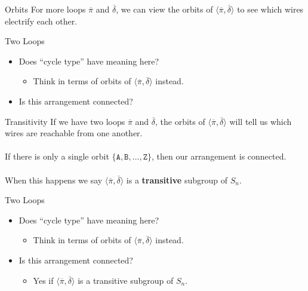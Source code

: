\documentclass[hyphens,aspectratio=169]{beamer}
\begin{document}
\begin{frame}{Orbits}
    For more loops $\overline\pi$ and $\overline\delta$, we can view the orbits of $\langle\overline\pi, \overline\delta\rangle$ to see which wires electrify each other.
\end{frame}


\begin{frame}{Two Loops}
	\begin{itemize}
		\item Does ``cycle type'' have meaning here?
		      \pause
		      \begin{itemize}
			      \item Think in terms of orbits of $\langle\overline\pi, \overline\delta\rangle$ instead.
		      \end{itemize}
		      \pause
		      \vspace{1em}
		\item Is this arrangement connected?
	\end{itemize}
\end{frame}

\begin{frame}{Transitivity}
	If we have two loops $\overline\pi$ and $\overline\delta$, the orbits of $\langle\overline\pi, \overline\delta\rangle$ will tell us which wires are reachable from one another.
	\pause
	\\\\If there is only a single orbit $\{\texttt{A}, \texttt{B},\dots, \texttt{Z}\}$, then our arrangement is connected.
	\pause
	\\\\When this happens we say $\langle\overline\pi, \overline\delta \rangle$ is a \textbf{transitive} subgroup of $S_n$.
\end{frame}

\begin{frame}{Two Loops}
	\begin{itemize}
		\item Does ``cycle type'' have meaning here?
		      \begin{itemize}
			      \item Think in terms of orbits of $\langle\overline\pi, \overline\delta\rangle$ instead.
		      \end{itemize}
		      \vspace{1em}
		\item Is this arrangement connected?
		      \pause
		      \begin{itemize}
			      \item Yes if $\langle\overline\pi, \overline\delta\rangle$ is a transitive subgroup of $S_n$.
		      \end{itemize}
	\end{itemize}
\end{frame}
\end{document}

